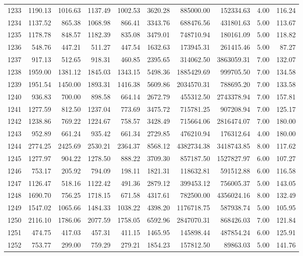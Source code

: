 \begin{tabular}{lrrrrrrrrr}
1233 & 1190.13 & 1016.63 & 1137.49 & 1002.53 & 3620.28 & 885000.00 & 152334.63 & 4.00 & 116.24 \\
1234 & 1137.52 & 865.38 & 1068.98 & 866.41 & 3343.76 & 688476.56 & 431801.63 & 5.00 & 113.67 \\
1235 & 1178.78 & 848.57 & 1182.39 & 835.08 & 3479.01 & 748710.94 & 180161.09 & 5.00 & 118.82 \\
1236 & 548.76 & 447.21 & 511.27 & 447.54 & 1632.63 & 173945.31 & 261415.46 & 5.00 & 87.27 \\
1237 & 917.13 & 512.65 & 918.31 & 460.85 & 2395.65 & 314062.50 & 3863059.31 & 7.00 & 132.07 \\
1238 & 1959.00 & 1381.12 & 1845.03 & 1343.15 & 5498.36 & 1885429.69 & 999705.50 & 7.00 & 134.58 \\
1239 & 1951.54 & 1450.00 & 1893.31 & 1416.38 & 5609.86 & 2034570.31 & 788695.20 & 7.00 & 133.58 \\
1240 & 936.83 & 700.00 & 898.58 & 664.14 & 2672.79 & 455312.50 & 2743378.94 & 7.00 & 157.81 \\
1241 & 1277.59 & 812.50 & 1237.04 & 773.69 & 3475.72 & 715781.25 & 907208.94 & 7.00 & 125.17 \\
1242 & 1238.86 & 769.22 & 1224.67 & 758.57 & 3428.49 & 715664.06 & 2816474.07 & 7.00 & 180.00 \\
1243 & 952.89 & 661.24 & 935.42 & 661.34 & 2729.85 & 476210.94 & 176312.64 & 4.00 & 180.00 \\
1244 & 2774.25 & 2425.69 & 2530.21 & 2364.37 & 8568.12 & 4382734.38 & 3418743.85 & 8.00 & 117.62 \\
1245 & 1277.97 & 904.22 & 1278.50 & 888.22 & 3709.30 & 857187.50 & 1527827.97 & 6.00 & 107.27 \\
1246 & 753.17 & 205.92 & 794.09 & 198.11 & 1821.31 & 118632.81 & 591512.88 & 6.00 & 116.58 \\
1247 & 1126.47 & 518.16 & 1122.42 & 491.36 & 2879.12 & 399453.12 & 756005.37 & 5.00 & 143.05 \\
1248 & 1690.70 & 756.25 & 1718.15 & 671.58 & 4317.61 & 782500.00 & 4356024.16 & 8.00 & 132.49 \\
1249 & 1547.02 & 1065.66 & 1484.33 & 1038.22 & 4398.20 & 1176718.75 & 587938.74 & 5.00 & 105.95 \\
1250 & 2116.10 & 1786.06 & 2077.59 & 1758.05 & 6592.96 & 2847070.31 & 868426.03 & 7.00 & 121.84 \\
1251 & 474.75 & 417.03 & 457.31 & 411.15 & 1465.95 & 145898.44 & 487854.24 & 6.00 & 125.91 \\
1252 & 753.77 & 299.00 & 759.29 & 279.21 & 1854.23 & 157812.50 & 89863.03 & 5.00 & 141.76 \\

\end{tabular}
